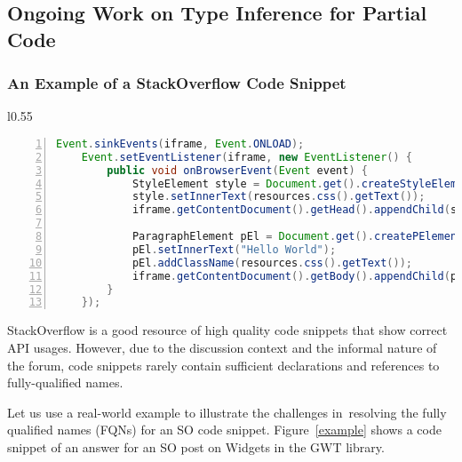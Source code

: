 \subsection{Ongoing Work on Type Inference for Partial Code}
\label{sec:statype}

\subsubsection{An Example of a StackOverflow Code Snippet}

\begin{wrapfigure}{l}{0.55\textwidth}
\begin{lstlisting}[basicstyle=\scriptsize\sffamily, stepnumber=1, numbers=left, numbersep=-6pt, framexleftmargin=0mm, framexrightmargin=0mm, language=Java, emph ={Event,sinkEvents,iframe,setEventListener,EventListener,StyleElement,Document,get,createStyleElement,setInnerText,resources,css,getText,getContentDocument,getHead,getBody,appendChild,ParagraphElement,createPElement,addClassName,whatever}]
    Event.sinkEvents(iframe, Event.ONLOAD);
    Event.setEventListener(iframe, new EventListener() {
        public void onBrowserEvent(Event event) {
            StyleElement style = Document.get().createStyleElement();
            style.setInnerText(resources.css().getText());
            iframe.getContentDocument().getHead().appendChild(style);

            ParagraphElement pEl = Document.get().createPElement();
            pEl.setInnerText("Hello World");
            pEl.addClassName(resources.css().getText());
            iframe.getContentDocument().getBody().appendChild(pEl);
        }
    });
\end{lstlisting}
\vspace{-0.1in}
\caption{StackOverflow post \#34595450 on GWT Widgets~\cite{soexample}}
\label{example}
\end{wrapfigure}

StackOverflow is a good resource of high quality code snippets that
show correct API usages. However, due to the discussion context and
the informal nature of the forum, code snippets rarely contain
sufficient declarations and references to fully-qualified names.


Let us use a real-world example to illustrate the 
challenges in~resolving 
the fully qualified names (FQNs) 
for an SO code snippet. Figure~\ref{example} shows a
code snippet of an answer for an SO post
on Widgets in the GWT library. 

